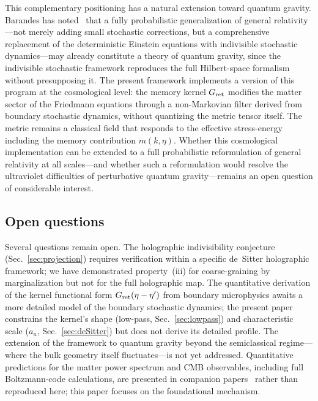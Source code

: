 \documentclass[aps,prd,twocolumn,superscriptaddress,nofootinbib]{revtex4-2}
\begin{document}
This complementary positioning has a natural extension toward quantum gravity. Barandes has noted~\cite{Barandes2025SQC} that a fully probabilistic generalization of general relativity---not merely adding small stochastic corrections, but a comprehensive replacement of the deterministic Einstein equations with indivisible stochastic dynamics---may already constitute a theory of quantum gravity, since the indivisible stochastic framework reproduces the full Hilbert-space formalism without presupposing it. The present framework implements a version of this program at the cosmological level: the memory kernel $G_{\rm ret}$ modifies the matter sector of the Friedmann equations through a non-Markovian filter derived from boundary stochastic dynamics, without quantizing the metric tensor itself. The metric remains a classical field that responds to the effective stress-energy including the memory contribution $m(k,\eta)$. Whether this cosmological implementation can be extended to a full probabilistic reformulation of general relativity at all scales---and whether such a reformulation would resolve the ultraviolet difficulties of perturbative quantum gravity---remains an open question of considerable interest.

\subsection{Open questions}

Several questions remain open. The holographic indivisibility conjecture (Sec.~\ref{sec:projection}) requires verification within a specific de~Sitter holographic framework; we have demonstrated property~(iii) for coarse-graining by marginalization but not for the full holographic map. The quantitative derivation of the kernel functional form $G_{\rm ret}(\eta - \eta')$ from boundary microphysics awaits a more detailed model of the boundary stochastic dynamics; the present paper constrains the kernel's shape (low-pass, Sec.~\ref{sec:lowpass}) and characteristic scale ($a_u$, Sec.~\ref{sec:deSitter}) but does not derive its detailed profile. The extension of the framework to quantum gravity beyond the semiclassical regime---where the bulk geometry itself fluctuates---is not yet addressed. Quantitative predictions for the matter power spectrum and CMB observables, including full Boltzmann-code calculations, are presented in companion papers~\cite{PaperI,PaperVIII} rather than reproduced here; this paper focuses on the foundational mechanism.
\end{document}
